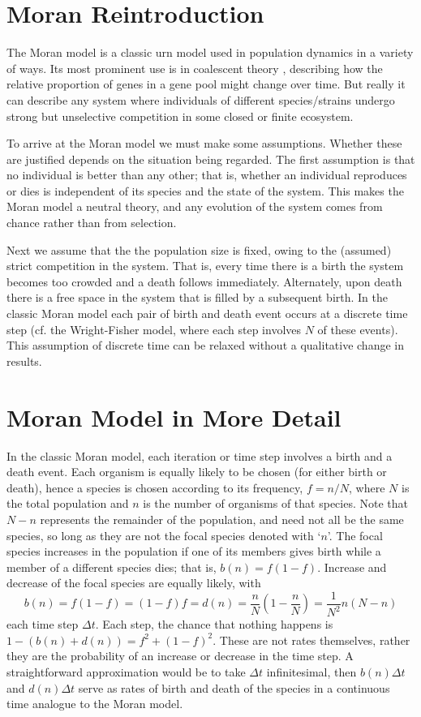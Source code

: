 \section{Moran Reintroduction}
The Moran model \cite{Moran1962} is a classic urn model used in population dynamics in a variety of ways.
Its most prominent use is in coalescent theory \cite{Blythe2007}, describing how the relative proportion of genes in a gene pool might change over time. 
But really it can describe any system where individuals of different species/strains undergo strong but unselective competition in some closed or finite ecosystem.

To arrive at the Moran model we must make some assumptions.
Whether these are justified depends on the situation being regarded.
The first assumption is that no individual is better than any other; that is, whether an individual reproduces or dies is independent of its species and the state of the system.
This makes the Moran model a neutral theory, and any evolution of the system comes from chance rather than from selection.

Next we assume that the the population size is fixed, owing to the (assumed) strict competition in the system.
That is, every time there is a birth the system becomes too crowded and a death follows immediately. Alternately, upon death there is a free space in the system that is filled by a subsequent birth.
In the classic Moran model each pair of birth and death event occurs at a discrete time step (cf. the Wright-Fisher model, where each step involves $N$ of these events).
This assumption of discrete time can be relaxed without a qualitative change in results.


\section{Moran Model in More Detail}
In the classic Moran model, each iteration or time step involves a birth and a death event.
Each organism is equally likely to be chosen (for either birth or death), hence a species is chosen according to its frequency, $f=n/N$, where $N$ is the total population and $n$ is the number of organisms of that species.
Note that $N-n$ represents the remainder of the population, and need not all be the same species, so long as they are not the focal species denoted with `$n$'.
The focal species increases in the population if one of its members gives birth while a member of a different species dies; that is, $b(n) = f(1-f)$.
Increase and decrease of the focal species are equally likely, with
\begin{equation}
b(n) = f(1-f) = (1-f)f = d(n) = \frac{n}{N}\left(1-\frac{n}{N}\right) = \frac{1}{N^2}n(N-n)
\end{equation}
each time step $\Delta t$.
Each step, the chance that nothing happens is $1-\left(b(n)+d(n)\right) = f^2 + (1-f)^2$.
These are not rates themselves, rather they are the probability of an increase or decrease in the time step.
A straightforward approximation would be to take $\Delta t$ infinitesimal, then $b(n)\Delta t$ and $d(n)\Delta t$ serve as rates of birth and death of the species in a continuous time analogue to the Moran model.

